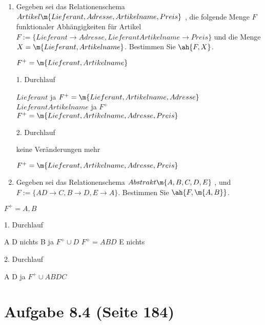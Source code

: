 \documentclass{bschlangaul-haupt}
\begin{document}
\begin{enumerate}

%

\item Gegeben sei das Relationenschema
$Artikel\m{Lieferant, Adresse, Artikelname, Preis}$ , die folgende
Menge $F$ funktionaler Abhängigkeiten für Artikel
$F := \{
  Lieferant \rightarrow Adresse,
  Lieferant Artikelname \rightarrow Preis
\}$
und die Menge
$X = \m{Lieferant, Artikelname}$.
Bestimmen Sie $\ah{F, X}$.

\begin{liAntwort}
$F^+ = \m{Lieferant, Artikelname}$

1. Durchlauf

$Lieferant$ ja $F^+ = \m{Lieferant, Artikelname, Adresse}$
$Lieferant Artikelname$ ja $F^+$ $F^+ = \m{Lieferant, Artikelname, Adresse, Preis}$

2. Durchlauf

keine Veränderungen mehr

$F^+ = \m{Lieferant, Artikelname, Adresse, Preis}$
\end{liAntwort}

%

\item Gegeben sei das Relationenschema $Abstrakt\m{A, B, C, D, E}$ , und
$F := \{
  A D \rightarrow C,
  B \rightarrow D,
  E \rightarrow A
\}$. Bestimmen Sie $\ah{F, \m{A, B}}$.
\end{enumerate}

\begin{liAntwort}
$F^+ = A, B$

1. Durchlauf

A D nichts
B ja $F^+ \cup D$ $F^+ = A B D$
E nichts

2. Durchlauf

A D ja $F^+ \cup A B D C$
\end{liAntwort}

%

\section{Aufgabe 8.4 (Seite 184)}
\end{document}
